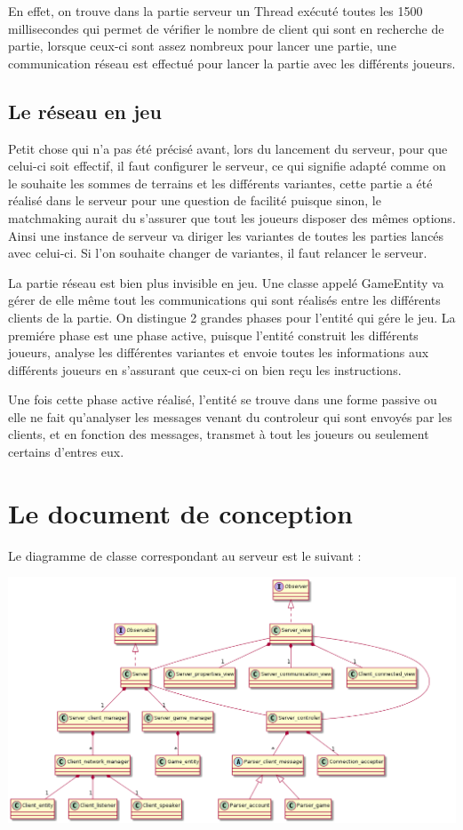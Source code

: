 \documentclass[12pt, openany]{report}
\begin{document}
En effet, on trouve dans la partie serveur un Thread exécuté toutes les 1500 millisecondes qui permet de vérifier le nombre de client qui sont en recherche de partie, lorsque ceux-ci sont assez nombreux pour lancer une partie, une communication réseau est effectué pour lancer la partie avec les différents joueurs.

	\subsection{Le réseau en jeu}
	Petit chose qui n'a pas été précisé avant, lors du lancement du serveur, pour que celui-ci soit effectif, il faut configurer le serveur, ce qui signifie adapté comme on le souhaite les sommes de terrains et les différents variantes, cette partie a été réalisé dans le serveur pour une question de facilité puisque sinon, le matchmaking aurait du s'assurer que tout les joueurs disposer des mêmes options. Ainsi une instance de serveur va diriger les variantes de toutes les parties lancés avec celui-ci. Si l'on souhaite changer de variantes, il faut relancer le serveur.

La partie réseau est bien plus invisible en jeu. Une classe appelé GameEntity va gérer de elle même tout les communications qui sont réalisés entre les différents clients de la partie. On distingue 2 grandes phases pour l'entité qui gére le jeu. La premiére phase est une phase active, puisque l'entité construit les différents joueurs, analyse les différentes variantes et envoie toutes les informations aux différents joueurs en s'assurant que ceux-ci on bien reçu les instructions.

Une fois cette phase active réalisé, l'entité se trouve dans une forme passive ou elle ne fait qu'analyser les messages venant du controleur qui sont envoyés par les clients, et en fonction des messages, transmet à tout les joueurs ou seulement certains d'entres eux.

    \section{Le document de conception}
	Le diagramme de classe correspondant au serveur est le suivant : 

	\includegraphics[scale=0.5]{diagram_server.png}
\end{document}
